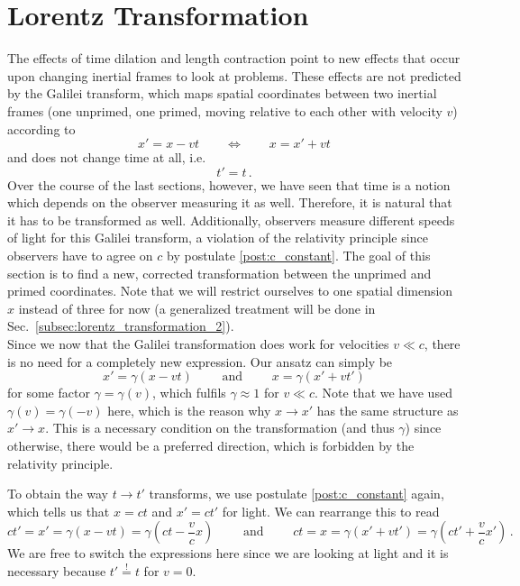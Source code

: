 \documentclass[../relativity_main.tex]{subfiles}
\begin{document}
	\section{Lorentz Transformation}\label{sec:lorentz_transformation_1}
The effects of time dilation and length contraction point to new effects that occur upon changing inertial frames to look at problems. These effects are not predicted by the Galilei transform, which maps spatial coordinates between two inertial frames (one unprimed, one primed, moving relative to each other with velocity $v$) according to 
\begin{equation*}
	x' = x - v t
	\qquad \Leftrightarrow \qquad
	x = x' + v t
\end{equation*}
and does not change time at all, i.e.
\begin{equation*}
	t' = t \, .
\end{equation*}
Over the course of the last sections, however, we have seen that time is a notion which depends on the observer measuring it as well. Therefore, it is natural that it has to be transformed as well. Additionally, observers measure different speeds of light for this Galilei transform, a violation of the relativity principle since observers have to agree on $c$ by postulate \ref{post:c_constant}. The goal of this section is to find a new, corrected transformation between the unprimed and primed coordinates. Note that we will restrict ourselves to one spatial dimension $x$ instead of three for now (a generalized treatment will be done in Sec.~\ref{subsec:lorentz_transformation_2}).\\


Since we now that the Galilei transformation does work for velocities $v \ll c$, there is no need for a completely new expression. Our ansatz can simply be
\begin{equation}\label{eq:lorentz_spatial_ansatz}
	x' = \gamma (x - vt)
	\qquad \text{ and } \qquad
	x = \gamma (x' + vt')
\end{equation}
for some factor $\gamma = \gamma(v)$, which fulfils $\gamma \approx 1$ for $v \ll c$. Note that we have used $\gamma(v) = \gamma(-v)$ here, which is the reason why $x \rightarrow x'$ has the same structure as $x' \rightarrow x$. This is a necessary condition on the transformation (and thus $\gamma$) since otherwise, there would be a preferred direction, which is forbidden by the relativity principle.

To obtain the way $t \rightarrow t'$ transforms, we use postulate \ref{post:c_constant} again, which tells us that $x = ct$ and $x' = ct'$ for light. We can rearrange this to read
\begin{equation}\label{eq:lorentz_time_ansatz}
	ct' = x' = \gamma (x - vt) = \gamma (ct - \frac{v}{c} x)
	\qquad \text{ and } \qquad
	ct = x = \gamma (x' + vt') = \gamma (ct' + \frac{v}{c} x') \, .
\end{equation}
We are free to switch the expressions here since we are looking at light and it is necessary because $t' \overset{!}{=} t$ for $v = 0$.
\end{document}
